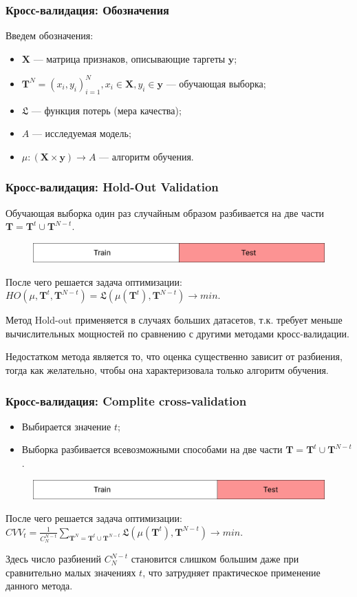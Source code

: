 \documentclass[11pt]{beamer}
\begin{document}
	\begin{frame}
		\frametitle{Кросс-валидация: Обозначения}
		Введем обозначения:
		\begin{itemize}
			\item $\bm{X}$ --- матрица признаков, описывающие таргеты $\bm{y}$;
			\item $\bm{T}^N = (x_i, y_i)_{i=1}^N, x_i \in \bm{X}, y_i \in \bm{y}$ --- обучающая выборка;
			\item $\mathfrak{L}$ --- функция потерь (мера качества);
			\item $A$ --- исследуемая модель;
			\item $\mu : (\bm{X}\times\bm{y})\rightarrow A$ --- алгоритм обучения.
		\end{itemize}
	\end{frame}
	\begin{frame}
		\frametitle{Кросс-валидация: Hold-Out Validation}
		Обучающая выборка один раз случайным образом разбивается на две части $\bm{T} = \bm{T}^t \cup \bm{T}^{N-t}$.
		\begin{figure}
			\includegraphics[width=0.9\linewidth]{imgs/hold-out}
		\end{figure}
		После чего решается задача оптимизации:
		$HO(\mu, \bm{T}^t, \bm{T}^{N-t}) = \mathfrak{L}(\mu(\bm{T}^t), \bm{T}^{N-t}) \rightarrow min$.
		
		
		Метод Hold-out применяется в случаях больших датасетов, т.к. требует меньше вычислительных мощностей по сравнению с другими методами кросс-валидации. 
		
		Недостатком метода является то, что оценка существенно зависит от разбиения, тогда как желательно, чтобы она характеризовала только алгоритм обучения.
	\end{frame}

	\begin{frame}
		\frametitle{Кросс-валидация: Complite cross-validation}
		\begin{itemize}
			\item Выбирается значение $t$;
			\item Выборка разбивается всевозможными способами на две части $\bm{T} = \bm{T}^t \cup \bm{T}^{N-t}$.
		\end{itemize}
		\begin{figure}
			\includegraphics[width=0.9\linewidth]{imgs/completecrossvalidation}
		\end{figure}
		После чего решается задача оптимизации:
		$CVV_t = \frac{1}{C_N^{N-t}}\sum\limits_{\bm{T}^N = \bm{T}^t \cup \bm{T}^{N-t}} \mathfrak{L}(\mu(\bm{T}^t), \bm{T}^{N-t}) \rightarrow min$.
		
		
		Здесь число разбиений $ C_N^{N-t} $ становится слишком большим даже при сравнительно малых значениях $ t $, что затрудняет практическое применение данного метода.
	\end{frame}
\end{document}
